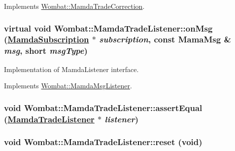 Implements \hyperlink{classWombat_1_1MamdaTradeCorrection_742b32f2bbf95daea48b555fb78f556d}{Wombat::Mamda\-Trade\-Correction}.\hypertarget{classWombat_1_1MamdaTradeListener_a9442f2307e319bd40fd3b274f281d58}{
\subsubsection[onMsg]{\setlength{\rightskip}{0pt plus 5cm}virtual void Wombat::Mamda\-Trade\-Listener::on\-Msg (\hyperlink{classWombat_1_1MamdaSubscription}{Mamda\-Subscription} $\ast$ {\em subscription}, const Mama\-Msg \& {\em msg}, short {\em msg\-Type})}}
\label{classWombat_1_1MamdaTradeListener_a9442f2307e319bd40fd3b274f281d58}


Implementation of Mamda\-Listener interface. 



Implements \hyperlink{classWombat_1_1MamdaMsgListener_c700829ebcce095b95b8b67b39a1c67d}{Wombat::Mamda\-Msg\-Listener}.\hypertarget{classWombat_1_1MamdaTradeListener_a856b95741b6f5bd795e626d4eedb5aa}{
\subsubsection[assertEqual]{\setlength{\rightskip}{0pt plus 5cm}void Wombat::Mamda\-Trade\-Listener::assert\-Equal (\hyperlink{classWombat_1_1MamdaTradeListener}{Mamda\-Trade\-Listener} $\ast$ {\em listener})}}
\label{classWombat_1_1MamdaTradeListener_a856b95741b6f5bd795e626d4eedb5aa}


\hypertarget{classWombat_1_1MamdaTradeListener_2f663afb08f020bb60e7049680b2cd5e}{
\subsubsection[reset]{\setlength{\rightskip}{0pt plus 5cm}void Wombat::Mamda\-Trade\-Listener::reset (void)}}
\label{classWombat_1_1MamdaTradeListener_2f663afb08f020bb60e7049680b2cd5e}


